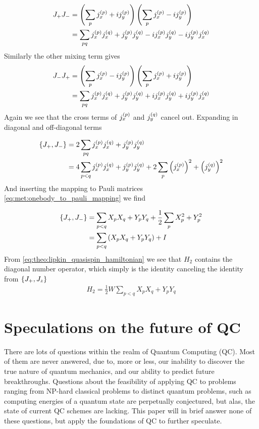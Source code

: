 \begin{align*}
    J_+ J_- &= \left(\sum_p j_{x}^{(p)} + ij_{y}^{(p)}\right) \left(\sum_p j_{x}^{(p)} - ij_{y}^{(p)}\right) \\
    &= \sum_{pq} j_{x}^{(p)}j_{x}^{(q)} + j_{y}^{(p)}j_{y}^{(q)} -i j_{x}^{(p)}j_{y}^{(q)} -i j_{y}^{(p)}j_{x}^{(q)}
\end{align*}
Similarly the other mixing term gives
\begin{align*}
    J_- J_+ &= \left(\sum_p j_{x}^{(p)} - ij_{y}^{(p)}\right) \left(\sum_p j_{x}^{(p)} + ij_{y}^{(p)}\right) \\
    &= \sum_{pq} j_{x}^{(p)}j_{x}^{(q)} + j_{y}^{(p)}j_{y}^{(q)} +i j_{x}^{(p)}j_{y}^{(q)} +i j_{y}^{(p)}j_{x}^{(q)}
\end{align*}
Again we see that the cross terms of $j_{x}^{(p)}$ and $j_{y}^{(q)}$ cancel out. Expanding in diagonal and off-diagonal terms

\begin{align*}
    \{J_+, J_-\} &= 2 \sum_{pq} j_{x}^{(p)}j_{x}^{(q)} + j_{y}^{(p)}j_{y}^{(q)} \\
    &= 4 \sum_{p < q} j_{x}^{(p)}j_{x}^{(q)} + j_{y}^{(p)}j_{y}^{(q)} + 2\sum_{p} \left(j_{x}^{(p)}\right)^2 + \left(j_{y}^{(q)}\right)^2
\end{align*}
And inserting the mapping to Pauli matrices \cref{eq:met:onebody_to_pauli_mapping} we find

\begin{align*}
    \{J_+, J_-\} &= \sum_{p < q} X_p X_q + Y_p Y_q + \frac{1}{2}\sum_{p}X_p^2 + Y_p^2 \\
     &= \sum_{p < q} \left(X_p X_q + Y_p Y_q\right) + I
\end{align*}
From \cref{eq:theo:lipkin_quasispin_hamiltonian} we see that $H_2$ contains the diagonal number operator, which simply is the identity canceling the identity from $\{J_+, J_z\}$
\begin{align}
    H_2 = \frac{1}{2}W \sum_{p < q} X_p X_q + Y_p Y_q 
\end{align}
\section{Speculations on the future of QC}
There are lots of questions within the realm of Quantum Computing (QC). Most of them are never answered, due to, more or less, our inability to discover the true nature of quantum mechanics, and our ability to predict future breakthroughs. Questions about the feasibility of applying QC to problems ranging from NP-hard classical problems to distinct quantum problems, such as computing energies of a quantum state are perpetually conjectured, but alas, the state of current QC schemes are lacking. This paper will in brief answer none of these questions, but apply the foundations of QC to further speculate.
